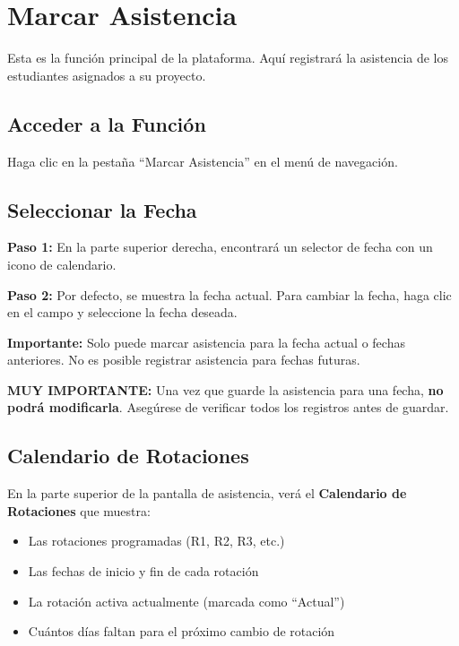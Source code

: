 \documentclass[11pt,a4paper]{article}
\begin{document}
\section{Marcar Asistencia}

Esta es la función principal de la plataforma. Aquí registrará la asistencia de los estudiantes asignados a su proyecto.

\subsection{Acceder a la Función}

Haga clic en la pestaña ``Marcar Asistencia'' en el menú de navegación.

\subsection{Seleccionar la Fecha}

\textbf{Paso 1:} En la parte superior derecha, encontrará un selector de fecha con un icono de calendario.

\textbf{Paso 2:} Por defecto, se muestra la fecha actual. Para cambiar la fecha, haga clic en el campo y seleccione la fecha deseada.

\begin{warningbox}
\textbf{Importante:} Solo puede marcar asistencia para la fecha actual o fechas anteriores. No es posible registrar asistencia para fechas futuras.
\end{warningbox}

\begin{warningbox}
\textbf{MUY IMPORTANTE:} Una vez que guarde la asistencia para una fecha, \textbf{no podrá modificarla}. Asegúrese de verificar todos los registros antes de guardar.
\end{warningbox}

\subsection{Calendario de Rotaciones}

En la parte superior de la pantalla de asistencia, verá el \textbf{Calendario de Rotaciones} que muestra:

\begin{itemize}
  \item Las rotaciones programadas (R1, R2, R3, etc.)
  \item Las fechas de inicio y fin de cada rotación
  \item La rotación activa actualmente (marcada como ``Actual'')
  \item Cuántos días faltan para el próximo cambio de rotación
\end{itemize}
\end{document}
